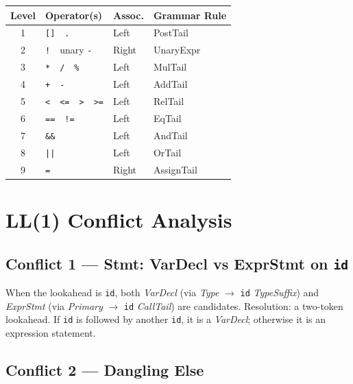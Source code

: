 \documentclass[12pt,a4paper]{article}
\begin{document}
\begin{center}
\begin{tabular}{clll}
\toprule
\textbf{Level} & \textbf{Operator(s)} & \textbf{Assoc.} & \textbf{Grammar Rule} \\
\midrule
1 & \texttt{[]}\ \ \texttt{.}               & Left  & PostTail   \\
2 & \texttt{!}\ \ unary \texttt{-}          & Right & UnaryExpr  \\
3 & \texttt{*}\ \ \texttt{/}\ \ \texttt{\%} & Left  & MulTail    \\
4 & \texttt{+}\ \ \texttt{-}                & Left  & AddTail    \\
5 & \texttt{<}\ \ \texttt{<=}\ \ \texttt{>}\ \ \texttt{>=} & Left & RelTail \\
6 & \texttt{==}\ \ \texttt{!=}              & Left  & EqTail     \\
7 & \texttt{\&\&}                           & Left  & AndTail    \\
8 & \texttt{||}                             & Left  & OrTail     \\
9 & \texttt{=}                              & Right & AssignTail \\
\bottomrule
\end{tabular}
\end{center}

\section{LL(1) Conflict Analysis}

\subsection{Conflict 1 --- Stmt: VarDecl vs ExprStmt on \texttt{id}}

When the lookahead is \texttt{id}, both \textit{VarDecl} (via
\textit{Type} $\rightarrow$ \texttt{id} \textit{TypeSuffix}) and
\textit{ExprStmt} (via \textit{Primary} $\rightarrow$ \texttt{id}
\textit{CallTail}) are candidates. Resolution: a two-token lookahead.
If \texttt{id} is followed by another \texttt{id}, it is a \textit{VarDecl};
otherwise it is an expression statement.

\subsection{Conflict 2 --- Dangling Else}
\end{document}
